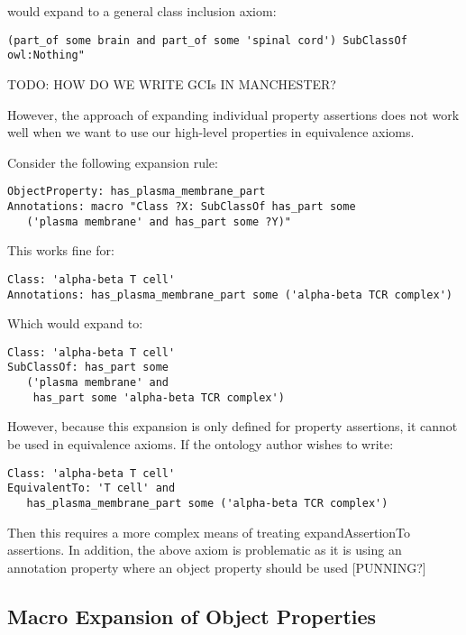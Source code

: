\documentclass[11pt]{article}
\begin{document}
would expand to a general class inclusion axiom:

\begin{verbatim}
(part_of some brain and part_of some 'spinal cord') SubClassOf owl:Nothing"
\end{verbatim}

TODO: HOW DO WE WRITE GCIs IN MANCHESTER?


However, the approach of expanding individual property assertions does
not work well when we want to use our high-level properties in
equivalence axioms.

Consider the following expansion rule:

\begin{verbatim}
ObjectProperty: has_plasma_membrane_part
Annotations: macro "Class ?X: SubClassOf has_part some 
   ('plasma membrane' and has_part some ?Y)"
\end{verbatim}

This works fine for:

\begin{verbatim}
Class: 'alpha-beta T cell'
Annotations: has_plasma_membrane_part some ('alpha-beta TCR complex')
\end{verbatim}

Which would expand to:

\begin{verbatim}
Class: 'alpha-beta T cell'
SubClassOf: has_part some 
   ('plasma membrane' and 
    has_part some 'alpha-beta TCR complex')
\end{verbatim}

However, because this expansion is only defined for property
assertions, it cannot be used in equivalence axioms. If the ontology
author wishes to write:

\begin{verbatim}
Class: 'alpha-beta T cell'
EquivalentTo: 'T cell' and 
   has_plasma_membrane_part some ('alpha-beta TCR complex')
\end{verbatim}

Then this requires a more complex means of treating expandAssertionTo
assertions. In addition, the above axiom is problematic as it is using
an annotation property where an object property should be used
[PUNNING?]

\subsection{Macro Expansion of Object Properties}
\end{document}
